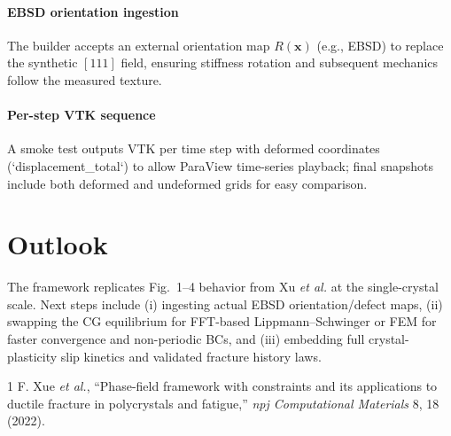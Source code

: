 \documentclass[11pt]{article}
\begin{document}
\paragraph{EBSD orientation ingestion} The builder accepts an external orientation map $R(\mathbf{x})$ (e.g., EBSD) to replace the synthetic $[111]$ field, ensuring stiffness rotation and subsequent mechanics follow the measured texture.

\paragraph{Per-step VTK sequence} A smoke test outputs VTK per time step with deformed coordinates (`displacement_total`) to allow ParaView time-series playback; final snapshots include both deformed and undeformed grids for easy comparison.

\section{Outlook}
The framework replicates Fig.~1--4 behavior from Xu \emph{et al.}\cite{paper} at the single-crystal scale. Next steps include (i) ingesting actual EBSD orientation/defect maps, (ii) swapping the CG equilibrium for FFT-based Lippmann--Schwinger or FEM for faster convergence and non-periodic BCs, and (iii) embedding full crystal-plasticity slip kinetics and validated fracture history laws.

\begin{thebibliography}{1}
 F. Xue \emph{et al.}, ``Phase-field framework with constraints and its applications to ductile fracture in polycrystals and fatigue,'' \emph{npj Computational Materials} 8, 18 (2022).
\end{thebibliography}
\end{document}
